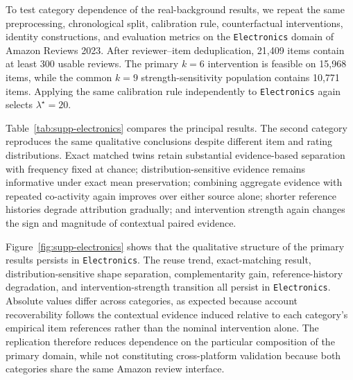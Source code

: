To test category dependence of the real-background results, we repeat the
same preprocessing, chronological split, calibration rule, counterfactual
interventions, identity constructions, and evaluation metrics on the
\texttt{Electronics} domain of Amazon Reviews 2023. After reviewer--item
deduplication, 21,409 items contain at least 300 usable reviews. The primary
$k=6$ intervention is feasible on 15,968 items, while the common $k=9$
strength-sensitivity population contains 10,771 items. Applying the same
calibration rule independently to \texttt{Electronics} again selects
$\lambda^\star=20$.

Table~\ref{tab:supp-electronics} compares the principal results.
The second category reproduces the same qualitative conclusions despite
different item and rating distributions. Exact matched twins retain
substantial evidence-based separation with frequency fixed at chance;
distribution-sensitive evidence remains informative under exact mean
preservation; combining aggregate evidence with repeated co-activity again
improves over either source alone; shorter reference histories degrade
attribution gradually; and intervention strength again changes the sign and
magnitude of contextual paired evidence.

Figure~\ref{fig:supp-electronics} shows that the qualitative structure of
the primary results persists in \texttt{Electronics}. The reuse trend, exact-matching
result, distribution-sensitive shape separation, complementarity gain,
reference-history degradation, and intervention-strength transition all
persist in \texttt{Electronics}. Absolute values differ across categories, as expected because account
recoverability follows the contextual evidence induced relative to each
category's empirical item references rather than the nominal intervention
alone. The replication
therefore reduces dependence on the particular composition of the primary
domain, while not constituting cross-platform validation because both
categories share the same Amazon review interface.


